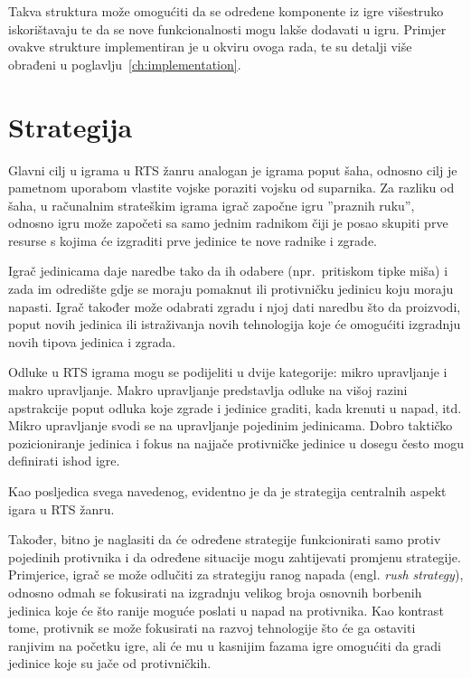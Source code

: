\documentclass[times, utf8, zavrsni, numeric]{fer}
\begin{document}
\par Takva struktura može omogućiti da se određene komponente iz igre višestruko iskorištavaju te da se nove funkcionalnosti mogu lakše dodavati u igru.
Primjer ovakve strukture implementiran je u okviru ovoga rada, te su detalji više obrađeni u poglavlju~\ref{ch:implementation}.

\section{Strategija}

\par Glavni cilj u igrama u RTS žanru analogan je igrama poput šaha, odnosno cilj je pametnom uporabom vlastite vojske poraziti vojsku od suparnika. 
Za razliku od šaha, u računalnim strateškim igrama igrač započne igru ''praznih ruku'', odnosno igru može započeti sa samo jednim radnikom čiji je posao skupiti prve resurse s kojima će izgraditi prve jedinice te nove radnike i zgrade.

\par Igrač jedinicama daje naredbe tako da ih odabere (npr.\ pritiskom tipke miša) i zada im odredište gdje se moraju pomaknut ili protivničku jedinicu koju moraju napasti. 
Igrač također može odabrati zgradu i njoj dati naredbu što da proizvodi, poput novih jedinica ili istraživanja novih tehnologija koje će omogućiti izgradnju novih tipova jedinica i zgrada.

\par Odluke u RTS igrama mogu se podijeliti u dvije kategorije: mikro upravljanje i makro upravljanje. 
Makro upravljanje predstavlja odluke na višoj razini apstrakcije poput odluka koje zgrade i jedinice graditi, kada krenuti u napad, itd. 
Mikro upravljanje svodi se na upravljanje pojedinim jedinicama.
Dobro taktičko pozicioniranje jedinica i fokus na najjače protivničke jedinice u dosegu često mogu definirati ishod igre.\cite{article:HybridPathdinding}

\par Kao posljedica svega navedenog, evidentno je da je strategija centralnih aspekt igara u RTS žanru. 

\par Također, bitno je naglasiti da će određene strategije funkcionirati samo protiv pojedinih protivnika i da određene situacije mogu zahtijevati promjenu strategije. 
Primjerice, igrač se može odlučiti za strategiju ranog napada (engl. \textit{rush strategy}), odnosno odmah se fokusirati na izgradnju velikog broja osnovnih borbenih jedinica koje će što ranije moguće poslati u napad na protivnika.
Kao kontrast tome, protivnik se može fokusirati na razvoj tehnologije što će ga ostaviti ranjivim na početku igre, ali će mu u kasnijim fazama igre omogućiti da gradi jedinice koje su jače od protivničkih.
\end{document}
